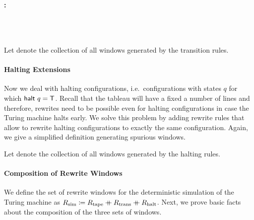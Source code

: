 \paragraph{:}
\begin{center}
  \quad {}\\
  \quad {} 
  \quad {} \\
  \quad {}
\end{center}

Let \mnotec[transRules]{$\Rtrans$} denote the collection of all windows generated by the transition rules. 

\paragraph{Halting Extensions}
Now we deal with halting configurations, i.e.\ configurations with states $q$ for which $\textsf{halt}~q = \mathsf{T}$. Recall that the tableau will have a fixed a number of lines and therefore, rewrites need to be possible even for halting configurations in case the Turing machine halts early. We solve this problem by adding rewrite rules that allow to rewrite halting configurations to exactly the same configuration. Again, we give a simplified definition generating spurious windows.

\begin{center}
  \quad {}
  \quad {}
\end{center}

Let \mnotec[haltRules]{$\Rhalt$} denote the collection of all windows generated by the halting rules.

\paragraph{Composition of Rewrite Windows}
We define the set of rewrite windows \mnotec[simRules]{$\Rsim$} for the deterministic simulation of the Turing machine as $R_{\text{sim}} \coloneqq R_{\text{tape}} \mathbin{+\mkern-10mu+} R_{\text{trans}} \mathbin{+\mkern-10mu+} R_{\text{halt}}$.
Next, we prove basic facts about the composition of the three sets of windows. 

